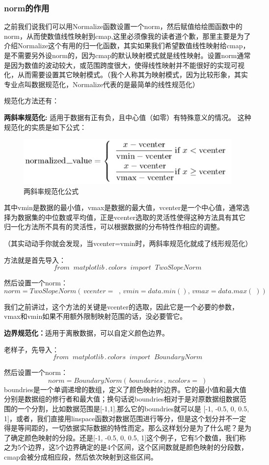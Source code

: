 \documentclass[12pt]{article}
\begin{document}
\subsubsection{norm的作用}
之前我们说我们可以用Normalize函数设置一个norm，然后赋值给绘图函数中的norm，从而使数值线性映射到cmap,这里必须像我的读者道个歉，那里主要是为了介绍Normalize这个有用的归一化函数，其实如果我们希望数值线性映射给cmap，是不需要另外设norm的，因为cmap的默认映射模式就是线性映射。设置norm通常是因为数值的波动较大，或范围跨度很大，使得线性映射并不能很好的实现可视化，从而需要设置其它映射模式。（我个人称其为映射模式，因为比较形象，其实专业点叫数据规范化，Normalize代表的是最简单的线性规范化）

规范化方法还有：

\noindent\textbf{两斜率规范化: }适用于数据有正有负，且中心值（如零）有特殊意义的情况。
这种规范化的实质是如下公式：
\begin{figure}[H]
    \centering
    \includegraphics[width=0.5\linewidth]{norm 公式1.png}
    \caption{两斜率规范化公式}
    \label{fig:enter-label}
\end{figure}
其中vmin是数据的最小值，vmax是数据的最大值，vcenter是一个中心值，通常选择为数据集的中位数或平均值，正是vcenter选取的灵活性使得这种方法具有其它归一化方法所不具有的灵活性，可以根据数据的分布特性作相应的调整。

（其实动动手你就会发现，当vcenter=vmin时，两斜率规范化就成了线形规范化）

方法就是首先导入：
\[from\;\; matplotlib\,.\,colors\;\; import\;\; TwoSlopeNorm\]

然后设置一个norm：
\[norm = TwoSlopeNorm(\,vcenter=\;\;,\, vmin=data.min(), \,vmax=data.max(\;))\]

我们之前讲过，这个方法的关键是vcenter的选取，因此它是一个必要的参数，vmax和vmin如果不用额外限制映射范围的话，没必要管它。

\noindent\textbf{边界规范化：}适用于离散数据，可以自定义颜色边界。

老样子，先导入：
\[from\;\; matplotlib\,.\,colors\;\; import\;\; BoundaryNorm\]

然后设置一个norm：
\[norm = BoundaryNorm(\,boundaries\,,\, ncolors=\;)\]
boundries是一个单调递增的数组，定义了颜色映射的边界。它的最小值和最大值分别是数据组的修行者和最大值；换句话说boundries相对于是对原数据组数据范围的一个分割，比如数据范围是[-1,1],那么它的boundries就可以是 [-1, -0.5, 0, 0.5, 1]，或者，我们直接用linspace函数对数据范围进行等分，但是这个划分并不一定得是等间距的，一切依据实际数据的特性而定。那么这样划分是为了什么呢？是为了确定颜色映射的分段。还是[-1, -0.5, 0, 0.5, 1]这个例子，它有5个数值，我们称之为5个边界，这5个边界确定的是4个区间，这个区间数就是颜色映射的分段数，cmap会被分成相应段，然后依次映射到这些区间。
\end{document}
